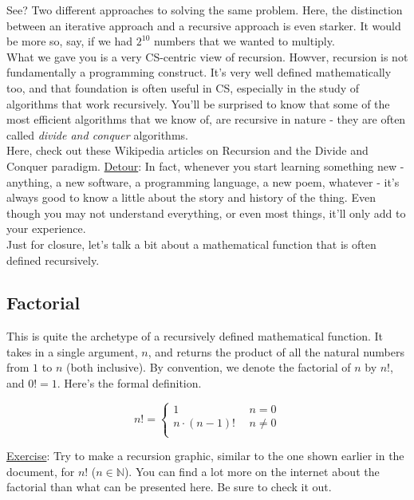 \documentclass{article}
\begin{document}
\noindent See? Two different approaches to solving the same problem. Here, the distinction between an iterative approach and a recursive approach is even starker. It would be more so, say, if we had $2^{10}$ numbers that we wanted to multiply. \\

\noindent What we gave you is a very CS-centric view of recursion. Howver, recursion is not fundamentally a programming construct. It's very well defined mathematically too, and that foundation is often useful in CS, especially in the study of algorithms that work recursively. You'll be surprised to know that some of the most efficient algorithms that we know of, are recursive in nature - they are often called \textit{divide and conquer} algorithms. \\

\noindent Here, check out these Wikipedia articles on Recursion\cite{Recursion in CS} and the Divide and Conquer paradigm\cite{Divide and Conquer}. \underline{Detour}: In fact, whenever you start learning something new - anything, a new software, a programming language, a new poem, whatever - it's always good to know a little about the story and history of the thing. Even though you may not understand everything, or even most things, it'll only add to your experience. \\

\noindent Just for closure, let's talk a bit about a mathematical function that is often defined recursively. 

\subsection{Factorial} 

\noindent This is quite the archetype of a recursively defined mathematical function. It takes in a single argument, $n$, and returns the product of all the natural numbers from $1$ to $n$ (both inclusive). By convention, we denote the factorial of $n$ by $n!$, and $0! = 1$. Here's the formal definition. 

\begin{displaymath}
    n! = \left\{
    \begin{array}{lr}
        1 & \ \ n = 0\\
        n\cdot (n-1)! & \ \ n \neq 0\\
    \end{array}
    \right.
\end{displaymath} 

\noindent \underline{Exercise}: Try to make a recursion graphic, similar to the one shown earlier in the document, for $n!$ ($n \in \mathbb{N}$). You can find a lot more on the internet about the factorial than what can be presented here. Be sure to check it out. \\
\end{document}
